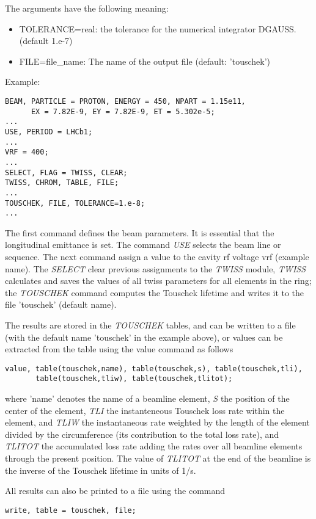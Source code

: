 The arguments have the following meaning: 
\begin{itemize}
   \item TOLERANCE=real: the tolerance for the numerical integrator DGAUSS. (default 1.e-7)
   \item FILE=file\_name: The name of the output file (default: 'touschek') 
\end{itemize}

Example: 
\begin{verbatim}
BEAM, PARTICLE = PROTON, ENERGY = 450, NPART = 1.15e11, 
      EX = 7.82E-9, EY = 7.82E-9, ET = 5.302e-5;      
...
USE, PERIOD = LHCb1;	
... 	
VRF = 400;
...
SELECT, FLAG = TWISS, CLEAR;
TWISS, CHROM, TABLE, FILE;
...
TOUSCHEK, FILE, TOLERANCE=1.e-8;
...
\end{verbatim}

The first command defines the beam parameters. It is essential that the
longitudinal emittance is set. The command
\textit{USE} selects the beam line or sequence. The next command assign
a value to the cavity rf voltage vrf  (example name). The
\textit{SELECT} clear previous assignments to the \textit{TWISS} module,
\textit{TWISS} calculates and saves the values of all twiss parameters
for all elements in the ring; the \textit{TOUSCHEK} command computes the
Touschek lifetime and writes it to the file 'touschek' (default name).   

The results are stored in the \textit{TOUSCHEK} tables, and can be written to a 
file (with the default name 'touschek' in the example above), or values can be 
extracted from the table using the value command as follows 
\begin{verbatim}
value, table(touschek,name), table(touschek,s), table(touschek,tli),
       table(touschek,tliw), table(touschek,tlitot); 
\end{verbatim}

where 'name' denotes the name of a beamline element, \textit{S} the
position of the center of the element, \textit{TLI} the instanteneous
Touschek loss rate within the element, and \textit{TLIW} the
instantaneous rate weighted by the length of the element divided by the
circumference (its contribution to the total loss rate), and
\textit{TLITOT} the accumulated loss rate adding the rates over all beamline
elements through the present position. The value of \textit{TLITOT} at
the end of the beamline is the inverse of the Touschek lifetime in units
of 1/s. 

All results can also be printed to a file using the command 
\begin{verbatim}
write, table = touschek, file;
\end{verbatim}


